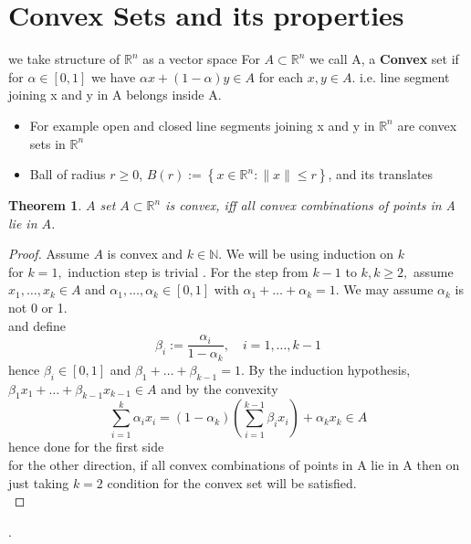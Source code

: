 \documentclass[oneside]{book}
\newtheorem{theorem}{Theorem}[section]
\begin{document}
\section{Convex Sets and its properties } \label{s:4}
we take structure of  $\mathbb{R}^n$ as a vector space 
For $ A \subset \mathbb{R}^n$ we call A, a \textbf{Convex} set  if for $\alpha \in [0,1]$ we have $\alpha x +(1- \alpha)y \in A $ for each  $x, y \in A.$  i.e. line segment joining x and y in A belongs inside A.\\
\begin{itemize}
    \item  For example open and closed line segments joining x and y in $\mathbb{R}^n$ are convex sets in $\mathbb{R}^n$

\item  

 Ball of radius $r \geq 0$,  $B (r):=\left\{x \in \mathbb{R}^{n}:\|x\| \leq r\right\}$,  and its translates
 
 \end{itemize}

 
\begin{theorem}
\label{t:4.5}
$A$ set $A \subset \mathbb{R}^{n}$ is convex, iff  all convex combinations of points in A lie
in $A$.
\end{theorem}

\begin{proof}

 Assume $A$ is convex and $k \in \mathbb{N} .$ We will be using induction on $k$ \\ for $k=1,$ induction step is trivial  . For the step from $k-1$ to $k, k \geq 2,$ assume $x_{1}, \ldots, x_{k} \in A$ and $\alpha_{1}, \ldots, \alpha_{k} \in[0,1]$ with $\alpha_{1}+\ldots+\alpha_{k}=1 .$ We may assume $\alpha_{k}$ is not 0 or 1.\\ and define 
$$
\beta_{i}:=\frac{\alpha_{i}}{1-\alpha_{k}}, \quad i=1, \ldots, k-1
$$
hence $\beta_{i} \in[0,1]$ and $\beta_{1}+\ldots+\beta_{k-1}=1 .$ By the induction hypothesis, $\beta_{1} x_{1}+\ldots+\beta_{k-1} x_{k-1} \in A$
and by the convexity
$$
\sum_{i=1}^{k} \alpha_{i} x_{i}=\left(1-\alpha_{k}\right)\left(\sum_{i=1}^{k-1} \beta_{i} x_{i}\right)+\alpha_{k} x_{k} \in A
$$
hence done for the first side\\
for the other direction, if all convex combinations of points in A lie in A then on just taking $k =2$ condition for the convex set will be satisfied.\\

\end{proof}.
\end{document}
